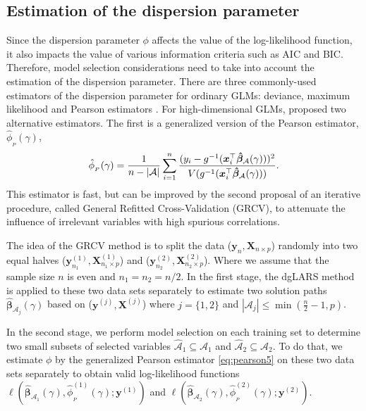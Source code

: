 \subsection[Estimation of the dispersion parameter]{Estimation of the dispersion parameter}
\label{subsec:estdisp}

Since the dispersion parameter $\phi$ affects the value of the log-likelihood function, it also impacts the value of various information criteria such as AIC and BIC. Therefore, model selection considerations need to take into account the estimation of the dispersion parameter. 
There are three commonly-used estimators of the dispersion parameter for ordinary GLMs: deviance, maximum likelihood and Pearson estimators \citep{mcc89}. For high-dimensional GLMs, \cite{pazira} proposed two alternative estimators. The first is a generalized version of the Pearson estimator, $\hat{\phi}_{_{P}}(\gamma)$, 
\begin{align}
\hat{\phi}_{_{P}}(\gamma) = \frac{1}{n-|\mathcal{A}|}\sum^n_{i=1}\frac{(y_i-g^{-1}(\bm{x}_i^\top \boldsymbol{\hat{\beta}}_{\mathcal{A}}(\gamma) ))^2}{V(g^{-1}(\bm{x}_i^\top \boldsymbol{\hat{\beta}}_{\mathcal{A}}(\gamma)))}.
\label{eq:pearson5}
\end{align}
This estimator is fast, but can be improved by the second proposal of an iterative procedure, called General Refitted Cross-Validation (GRCV), to attenuate the influence of irrelevant variables with high spurious correlations. 

The idea of the GRCV method is to split the data ($\bm{y}_{n}, \bm{X}_{n \times p}$) randomly into two equal halves ($\bm{y}_{n_1}^{(1)}, \bm{X}^{(1)}_{n_1 \times p}$) and ($\bm{y}_{n_2}^{(2)}, \bm{X}^{(2)}_{n_2 \times p}$). Where we assume that the sample size $n$ is even and $n_1=n_2=n/2$.
In the first stage, the dgLARS method is applied to these two data sets separately to estimate two solution paths $\boldsymbol{\hat{\beta}}_{{\mathcal{A}}_j}(\gamma)$ based on ($\bm{y}^{(j)}, \bm{X}^{(j)}$) where $j=\{1, 2 \}$ and $|{\mathcal{A}}_j| \leq \min(\frac{n}{2}-1,p)$.

In the second stage, we perform model selection on each training set to determine two small subsets of selected variables $\hat{\mathcal{A}}_1 \subseteq {\mathcal{A}}_1$ and $\hat{\mathcal{A}}_2 \subseteq {\mathcal{A}}_2$.
To do that, we estimate $\phi$ by the generalized Pearson estimator \eqref{eq:pearson5} on these two data sets separately to obtain valid log-likelihood functions $ \ell (\boldsymbol{\hat{\beta}}_{\mathcal{A}_1}(\gamma),\hat{\phi}_{_{P}}^{(1)}(\gamma);\bm{y}^{(1)}) $ and $ \ell (\boldsymbol{\hat{\beta}}_{\mathcal{A}_2}(\gamma),\hat{\phi}_{_{P}}^{(2)}(\gamma);\bm{y}^{(2)}) $.

